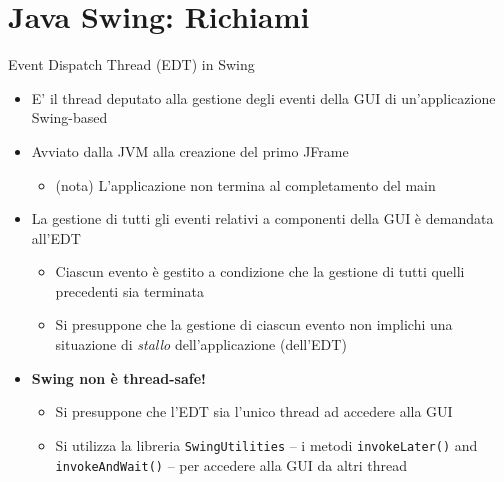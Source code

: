 \documentclass[xcolor=dvipsnames,presentation]{beamer}
\begin{document}
\section{Java Swing: Richiami}

\begin{frame}{Event Dispatch Thread (EDT) in Swing}
\begin{itemize}\itemsep10pt
\item E' il thread deputato alla gestione degli eventi della GUI di un'applicazione Swing-based
\item Avviato dalla JVM alla creazione del primo JFrame
\begin{itemize}
\item (nota) L'applicazione non termina al completamento del main
\end{itemize}
\item La gestione di tutti gli eventi relativi a componenti della GUI è demandata all'EDT
\begin{itemize}
\item Ciascun evento è gestito a condizione che la gestione di tutti quelli precedenti sia terminata
\item Si presuppone che la gestione di ciascun evento non implichi una situazione di \emph{stallo} dell'applicazione (dell'EDT)
\end{itemize}
\item \textbf{Swing non è thread-safe!}
\begin{itemize}
\item Si presuppone che l'EDT sia l'unico thread ad accedere alla GUI
\item Si utilizza la libreria \texttt{SwingUtilities} -- i metodi \texttt{invokeLater()} and \texttt{invokeAndWait()} -- per accedere alla GUI da altri thread
\end{itemize}
\end{itemize}
\end{frame}
\end{document}

